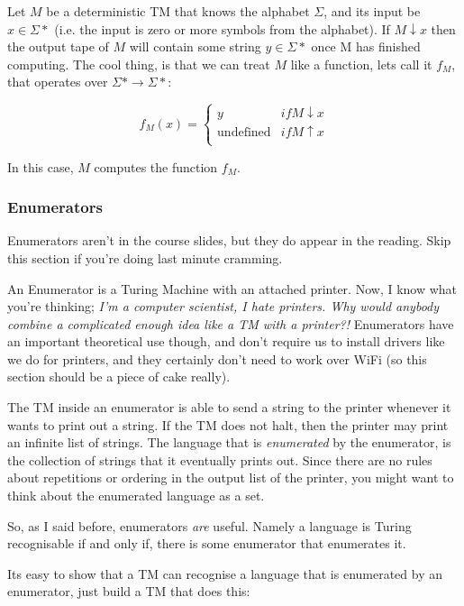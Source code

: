 Let $M$ be a deterministic TM that knows the alphabet $\Sigma$, and its input be
$x \in \Sigma*$ (i.e. the input is zero or more symbols from the alphabet). If
$M \downarrow x$ then the output tape of $M$ will contain some string $y \in
\Sigma*$ once M has finished computing. The cool thing, is that we can treat $M$
like a function, lets call it $f_M$, that operates over $\Sigma* \rightarrow
\Sigma*$:

\[
  f_M(x) = \begin{cases}
       y & if M \downarrow x\\
       \text{undefined} & if M \uparrow x\\
     \end{cases}
\]

In this case, $M$ computes the function $f_M$.

\subsubsection{Enumerators}

Enumerators aren't in the course slides, but they do appear in the reading. Skip
this section if you're doing last minute cramming.

An Enumerator is a Turing Machine with an attached printer. Now, I know what
you're thinking; \textit{I'm a computer scientist, I hate printers. Why would
anybody combine a complicated enough idea like a TM with a printer?!}
Enumerators have an important theoretical use though, and don't require us to
install drivers like we do for printers, and they certainly don't need to work
over WiFi (so this section should be a piece of cake really).

The TM inside an enumerator is able to send a string to the printer whenever it
wants to print out a string. If the TM does not halt, then the printer may print
an infinite list of strings. The language that is \textit{enumerated} by the
enumerator, is the collection of strings that it eventually prints out. Since
there are no rules about repetitions or ordering in the output list of the
printer, you might want to think about the enumerated language as a set.

So, as I said before, enumerators \textit{are} useful. Namely a language is
Turing recognisable if and only if, there is some enumerator that enumerates it.

Its easy to show that a TM can recognise a language that is enumerated by an
enumerator, just build a TM that does this:


